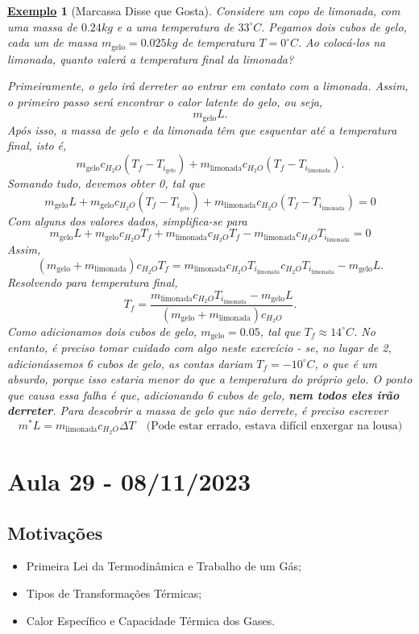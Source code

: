 \documentclass{article}
\newtheorem{example}{\underline{Exemplo}}
\begin{document}
\begin{example}[Marcassa Disse que Gosta]
  Considere um copo de limonada, com uma massa de \(0.24kg\) e a uma temperatura de \(33^{\circ{}}C.\)
  Pegamos dois cubos de gelo, cada um de massa \(m_{\text{gelo}} = 0.025kg\) de temperatura \(T = 0^{\circ{}}C.\) Ao colocá-los na limonada,
  quanto valerá a temperatura final da limonada?

  Primeiramente, o gelo irá derreter ao entrar em contato com a limonada. Assim, o primeiro passo será encontrar
  o calor latente do gelo, ou seja, 
  \[
    m_{\text{gelo}}L.
  \]
  Após isso, a massa de gelo e da limonada têm que esquentar até a temperatura final, isto é, 
  \[
    m_{\text{gelo}}c_{H_{2}O}(T_{f} - T_{i_{\text{gelo}}}) + m_{\text{limonada}}c_{H_{2}O}(T_{f}-T_{i_{\text{limonada}}}).
  \]
  Somando tudo, devemos obter 0, tal que 
  \[
    m_{\text{gelo}}L + m_{\text{gelo}}c_{H_{2}O}(T_{f} - T_{i_{\text{gelo}}}) + m_{\text{limonada}}c_{H_{2}O}(T_{f}-T_{i_{\text{limonada}}}) = 0
  \]
  Com alguns dos valores dados, simplifica-se para 
  \[
    m_{\text{gelo}}L + m_{\text{gelo}}c_{H_{2}O}T_{f} + m_{\text{limonada}}c_{H_{2}O}T_{f} - m_{\text{limonada}}c_{H_{2}O}T_{i_{\text{limonada}}} = 0 
  \]
  Assim, 
  \[
    (m_{\text{gelo}}+m_{\text{limonada}})c_{H_{2}O}T_{f} = m_{\text{limonada}}c_{H_{2}O}T_{i_{\text{limonada}}}c_{H_{2}O}T_{i_{\text{limonada}}} - m_{\text{gelo}}L.
  \]
  Resolvendo para temperatura final, 
  \[
    T_{f} = \frac{m_{\text{limonada}}c_{H_{2}O}T_{i_{\text{limonada}}} - m_{\text{gelo}}L}{(m_{\text{gelo}}+m_{\text{limonada}})c_{H_{2}O}}.
  \]
  Como adicionamos dois cubos de gelo, \(m_{\text{gelo}} = 0.05\), tal que \(T_{f}\approx 14^{\circ{}}C\). No entanto, é preciso tomar cuidado com algo neste exercício -
  se, no lugar de 2, adicionássemos 6 cubos de gelo, as contas dariam \(T_{f} = -10^{\circ{}}C\), o que é um absurdo, porque isso estaria menor do que
  a temperatura do próprio gelo. O ponto que causa essa falha é que, adicionando 6 cubos de gelo, \textbf{nem todos eles irão derreter}. Para 
  descobrir a massa de gelo que não derrete, é preciso escrever 
  \[
    m^{*}L = m_{\text{limonada}}c_{H_{2}O}\Delta T\quad \text{(Pode estar errado, estava difícil enxergar na lousa)}
  \]
\end{example}
\newpage

\section{Aula 29 - 08/11/2023}
\subsection{Motivações} 
\begin{itemize}
  \item Primeira Lei da Termodinâmica e Trabalho de um Gás;
  \item Tipos de Transformações Térmicas;
  \item Calor Específico e Capacidade Térmica dos Gases.
\end{itemize}
\end{document}
